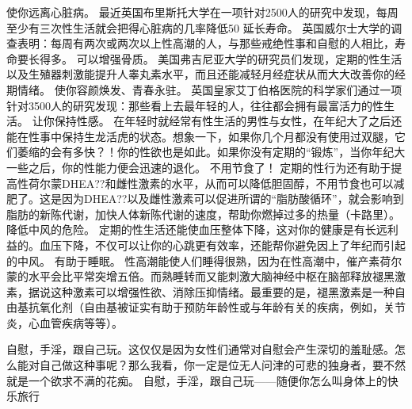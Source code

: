 \documentclass[12pt,UTF8,openany]{ctexbook}
\begin{document}
使你远离心脏病。
最近英国布里斯托大学在一项针对2500人的研究中发现，每周至少有三次性生活就会把得心脏病的几率降低50%
延长寿命。
英国威尔士大学的调查表明：每周有两次或两次以上性高潮的人，与那些戒绝性事和自慰的人相比，寿命要长得多。
可以增强骨质。
美国弗吉尼亚大学的研究员们发现，定期的性生活以及生殖器刺激能提升人睾丸素水平，而且还能减轻月经症状从而大大改善你的经期情绪。
使你容颜焕发、青春永驻。
英国皇家艾丁伯格医院的科学家们通过一项针对3500人的研究发现：那些看上去最年轻的人，往往都会拥有最富活力的性生活。
让你保持性感。
在年轻时就经常有性生活的男性与女性，在年纪大了之后还能在性事中保持生龙活虎的状态。想象一下，如果你几个月都没有使用过双腿，它们萎缩的会有多快？！你的性欲也是如此。如果你没有定期的“锻炼”，当你年纪大一些之后，你的性能力便会迅速的退化。
不用节食了！
定期的性行为还有助于提高性荷尔蒙DHEA??和雌性激素的水平，从而可以降低胆固醇，不用节食也可以减肥了。这是因为DHEA??以及雌性激素可以促进所谓的“脂肪酸循环”，就会影响到脂肪的新陈代谢，加快人体新陈代谢的速度，帮助你燃掉过多的热量（卡路里）。
降低中风的危险。
定期的性生活还能使血压整体下降，这对你的健康是有长远利益的。血压下降，不仅可以让你的心跳更有效率，还能帮你避免因上了年纪而引起的中风。
有助于睡眠。
性高潮能使人们睡得很熟，因为在性高潮中，催产素荷尔蒙的水平会比平常突增五倍。而熟睡转而又能刺激大脑神经中枢在脑部释放褪黑激素，据说这种激素可以增强性欲、消除压抑情绪。最重要的是，褪黑激素是一种自由基抗氧化剂（自由基被证实有助于预防年龄性或与年龄有关的疾病，例如，关节炎，心血管疾病等等）。

自慰，手淫，跟自己玩。这仅仅是因为女性们通常对自慰会产生深切的羞耻感。怎么能对自己做这种事呢？那么我看，你一定是位无人问津的可悲的独身者，要不然就是一个欲求不满的花痴。
自慰，手淫，跟自己玩——随便你怎么叫身体上的快乐旅行
\end{document}
